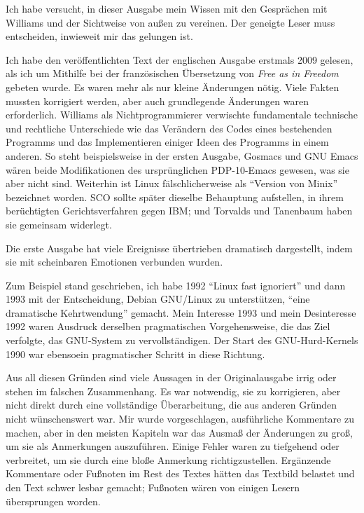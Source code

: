 

Ich habe versucht, in dieser Ausgabe mein Wissen mit den Gesprächen mit Williams und der Sichtweise von außen zu vereinen. Der geneigte Leser muss entscheiden, inwieweit mir das gelungen ist.

Ich habe den veröffentlichten Text der englischen Ausgabe erstmals 2009 gelesen, als ich um Mithilfe bei der französischen Übersetzung von \textit{Free as in Freedom} gebeten wurde. Es waren mehr als nur kleine Änderungen nötig. Viele Fakten mussten korrigiert werden, aber auch grundlegende Änderungen waren erforderlich. Williams als Nichtprogrammierer verwischte fundamentale technische und rechtliche Unterschiede wie das Verändern des Codes eines bestehenden Programms und das Implementieren einiger Ideen des Programms in einem anderen. So steht beispielsweise in der ersten Ausgabe, Gosmacs und GNU Emacs wären beide Modifikationen des ursprünglichen PDP-10-Emacs gewesen, was sie aber nicht sind. Weiterhin ist Linux fälschlicherweise als "`Version von Minix"' bezeichnet worden. SCO sollte später dieselbe Behauptung aufstellen, in ihrem berüchtigten Gerichtsverfahren gegen IBM; und Torvalds und Tanenbaum haben sie gemeinsam widerlegt. 

Die erste Ausgabe hat viele Ereignisse übertrieben dramatisch dargestellt, indem sie mit scheinbaren Emotionen verbunden wurden. 

Zum Beispiel stand geschrieben, ich habe 1992 "`Linux fast ignoriert"' und dann 1993 mit der Entscheidung, Debian GNU/Linux zu unterstützen, "`eine dramatische Kehrtwendung"' gemacht. Mein Interesse 1993 und mein Desinteresse 1992 waren Ausdruck derselben pragmatischen Vorgehensweise, die das Ziel verfolgte, das GNU-System zu vervollständigen. 
Der Start des GNU-Hurd-Kernels 1990 war ebensoein pragmatischer Schritt in diese Richtung.

Aus all diesen Gründen sind viele Aussagen in der Originalausgabe irrig oder stehen im falschen Zusammenhang. Es war notwendig, sie zu korrigieren, aber nicht direkt durch eine vollständige Überarbeitung, die aus anderen Gründen nicht wünschenswert war. Mir wurde vorgeschlagen, ausführliche Kommentare zu machen, aber in den meisten Kapiteln war das Ausmaß der Änderungen zu groß, um sie als Anmerkungen auszuführen. Einige Fehler waren zu tiefgehend oder verbreitet, um sie durch eine bloße Anmerkung richtigzustellen. Ergänzende Kommentare oder Fußnoten im Rest des Textes hätten das Textbild belastet und den Text schwer lesbar gemacht; Fußnoten wären von einigen Lesern übersprungen worden.
 
